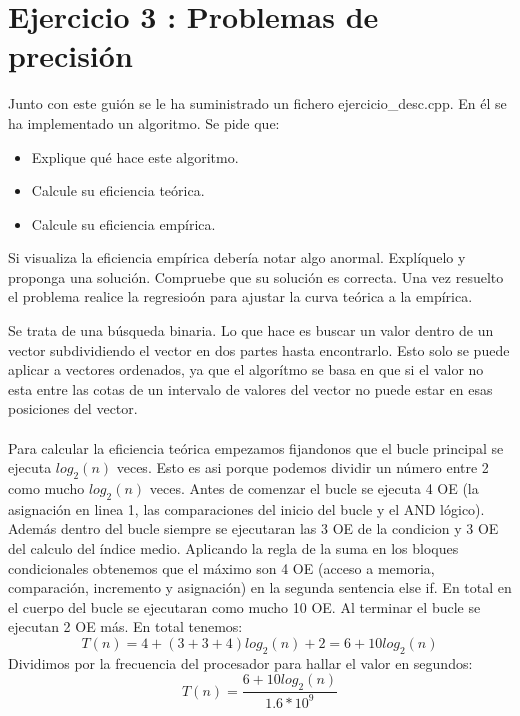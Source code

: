 \documentclass{article}
\begin{document}
\clearpage
\section{Ejercicio 3 : Problemas de precisión}
Junto con este guión se le ha suministrado un fichero ejercicio\_desc.cpp. En él se ha implementado un algoritmo. Se pide que:
\begin{itemize}
	\item Explique qué hace este algoritmo.
	\item Calcule su eficiencia teórica.
	\item Calcule su eficiencia empírica.
\end{itemize}
Si visualiza la eficiencia empírica debería notar algo anormal. Explíquelo y proponga una solución. Compruebe que su solución es correcta. Una vez resuelto el problema realice la regresioón para ajustar la curva teórica a la empírica.\\
\clearpage


	Se trata de una b\'usqueda binaria. Lo que hace es buscar un valor dentro de un vector subdividiendo el vector en dos partes hasta encontrarlo. Esto solo se puede aplicar a vectores ordenados, ya que el algor\'itmo se basa en que si el valor no esta entre las cotas de un intervalo de valores del vector no puede estar en esas posiciones del vector. \\ \\
	Para calcular la eficiencia te\'orica empezamos fijandonos que el bucle principal se ejecuta $log_2(n)$ veces. Esto es asi porque podemos dividir un n\'umero entre 2 como mucho  $log_2(n)$ veces. Antes de comenzar el bucle se ejecuta 4 OE (la asignaci\'on en linea 1, las comparaciones del inicio del bucle y el AND l\'ogico). Adem\'as dentro del bucle siempre se ejecutaran las 3 OE de la condicion y 3 OE del calculo del \'indice medio. Aplicando la regla de la suma en los bloques condicionales obtenemos que el m\'aximo son 4 OE (acceso a memoria, comparaci\'on, incremento y asignaci\'on) en la segunda sentencia else if. En total en el cuerpo del bucle se ejecutaran como mucho 10 OE. Al terminar el bucle se ejecutan 2 OE m\'as.
	En total tenemos: 
	\begin{equation}
		T(n) = 4 + (3+3+4)log_2(n) + 2 = 6+ 10log_2(n)
	\end{equation} 
	Dividimos por la frecuencia del procesador para hallar el valor en segundos:
	\begin{equation}
		T(n) = \frac{6+10log_2(n)}{1.6*10^9}
	\end{equation}
	
\end{document}
